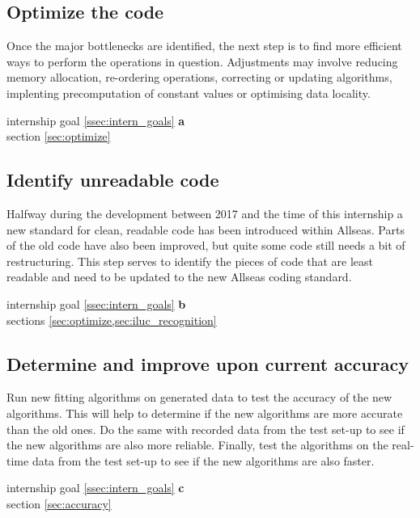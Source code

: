\subsection{Optimize the code} \label{ssec:optimize_code}
Once the major bottlenecks are identified, the next step is to find more efficient ways to perform the operations in question. Adjustments
may involve reducing memory allocation, re-ordering operations, correcting or updating algorithms, implenting precomputation of constant values
or optimising data locality.
\begin{flushright}
     internship goal \ref{ssec:intern_goals} \textbf{a}\\
    \large{} section \ref{sec:optimize}
\end{flushright}

\subsection{Identify unreadable code} \label{ssec:unreadable_code}
Halfway during the development between 2017 and the time of this internship a new standard for clean, readable code has been
introduced within Allseas. Parts of the old code have also been improved, but quite some code still needs a bit of restructuring.
This step serves to identify the pieces of code that are least readable and need to be updated to the new Allseas coding standard.
\begin{flushright}
     internship goal \ref{ssec:intern_goals} \textbf{b}\\
    \large{} sections \cref{sec:optimize,sec:iluc_recognition}
\end{flushright}

\subsection{Determine and improve upon current accuracy} \label{ssec:test_accuracy}
Run new fitting algorithms on generated data to test the accuracy of the new algorithms.
This will help to determine if the new algorithms are more accurate than the old ones. Do the same
with recorded data from the test set-up to see if the new algorithms are also more reliable. Finally,
test the algorithms on the real-time data from the test set-up to see if the new algorithms are also faster.
\begin{flushright}
     internship goal \ref{ssec:intern_goals} \textbf{c}\\
    \large{} section \ref{sec:accuracy}
\end{flushright}

